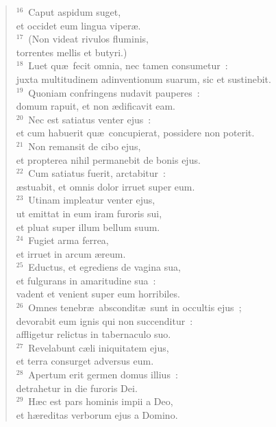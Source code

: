 \begin{flushleft}
\begin{verse}
${}^{16}$~Caput aspidum suget,\\ et occidet eum lingua viper\ae .\\
${}^{17}$~(Non videat rivulos fluminis,\\ torrentes mellis et butyri.)\\
${}^{18}$~Luet qu\ae\ fecit omnia, nec tamen consumetur~:\\ juxta multitudinem adinventionum suarum, sic et sustinebit.\\
${}^{19}$~Quoniam confringens nudavit pauperes~:\\ domum rapuit, et non \ae dificavit eam.\\
${}^{20}$~Nec est satiatus venter ejus~:\\ et cum habuerit qu\ae\ concupierat, possidere non poterit.\\
${}^{21}$~Non remansit de cibo ejus,\\ et propterea nihil permanebit de bonis ejus.\\
${}^{22}$~Cum satiatus fuerit, arctabitur~:\\ \ae stuabit, et omnis dolor irruet super eum.\\
${}^{23}$~Utinam impleatur venter ejus,\\ ut emittat in eum iram furoris sui,\\ et pluat super illum bellum suum.\\
${}^{24}$~Fugiet arma ferrea,\\ et irruet in arcum \ae reum.\\
${}^{25}$~Eductus, et egrediens de vagina sua,\\ et fulgurans in amaritudine sua~:\\ vadent et venient super eum horribiles.\\
${}^{26}$~Omnes tenebr\ae\ abscondit\ae\ sunt in occultis ejus~;\\ devorabit eum ignis qui non succenditur~:\\ affligetur relictus in tabernaculo suo.\\
${}^{27}$~Revelabunt c\ae li iniquitatem ejus,\\ et terra consurget adversus eum.\\
${}^{28}$~Apertum erit germen domus illius~:\\ detrahetur in die furoris Dei.\\
${}^{29}$~H\ae c est pars hominis impii a Deo,\\ et h\ae reditas verborum ejus a Domino.\end{verse}\end{flushleft}



